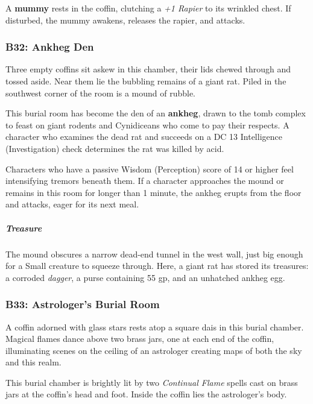 \documentclass[10pt,a4paper,twoside,bg=print,twocolumn,openany,nodeprecatedcode]{dndbook}
\begin{document}
A \textbf{mummy} rests in the coffin, clutching a \textit{+1 Rapier} to its wrinkled chest. If disturbed, the mummy awakens, releases the rapier, and attacks.

\subsubsection{B32: Ankheg Den}
\begin{DndReadAloud}{}
Three empty coffins sit askew in this chamber, their lids chewed through and tossed aside. Near them lie the bubbling remains of a giant rat. Piled in the southwest corner of the room is a mound of rubble.

\end{DndReadAloud}

This burial room has become the den of an \textbf{ankheg}, drawn to the tomb complex to feast on giant rodents and Cynidiceans who come to pay their respects. A character who examines the dead rat and succeeds on a DC 13 Intelligence (Investigation) check determines the rat was killed by acid.

Characters who have a passive Wisdom (Perception) score of 14 or higher feel intensifying tremors beneath them. If a character approaches the mound or remains in this room for longer than 1 minute, the ankheg erupts from the floor and attacks, eager for its next meal.

\subparagraph{Treasure}
The mound obscures a narrow dead-end tunnel in the west wall, just big enough for a Small creature to squeeze through. Here, a giant rat has stored its treasures: a corroded \textit{dagger}, a purse containing 55 gp, and an unhatched ankheg egg.

\subsubsection{B33: Astrologer's Burial Room}
\begin{DndReadAloud}{}
A coffin adorned with glass stars rests atop a square dais in this burial chamber. Magical flames dance above two brass jars, one at each end of the coffin, illuminating scenes on the ceiling of an astrologer creating maps of both the sky and this realm.

\end{DndReadAloud}

This burial chamber is brightly lit by two \textit{Continual Flame} spells cast on brass jars at the coffin's head and foot. Inside the coffin lies the astrologer's body.
\end{document}
